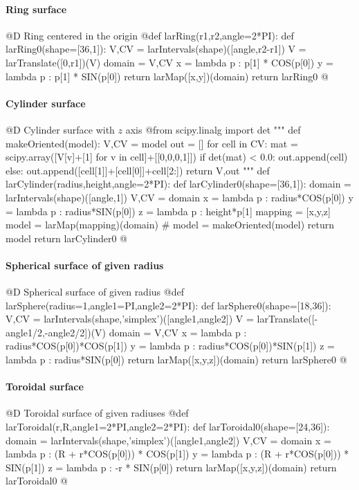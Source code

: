 \documentclass[11pt,oneside]{article}	%
\begin{document}
\paragraph{Ring surface}
@D Ring centered in the origin
@{def larRing(r1,r2,angle=2*PI):
	def larRing0(shape=[36,1]):
		V,CV = larIntervals(shape)([angle,r2-r1])
		V = larTranslate([0,r1])(V)
		domain = V,CV
		x = lambda p : p[1] * COS(p[0])
		y = lambda p : p[1] * SIN(p[0])
		return larMap([x,y])(domain)
	return larRing0
@}
\paragraph{Cylinder surface}
@D Cylinder surface with $z$ axis
@{from scipy.linalg import det
"""
def makeOriented(model):
	V,CV = model
	out = []
	for cell in CV: 
		mat = scipy.array([V[v]+[1] for v in cell]+[[0,0,0,1]])
		if det(mat) < 0.0:
			out.append(cell)
		else:
			out.append([cell[1]]+[cell[0]]+cell[2:])
	return V,out
"""
def larCylinder(radius,height,angle=2*PI):
	def larCylinder0(shape=[36,1]):
		domain = larIntervals(shape)([angle,1])
		V,CV = domain
		x = lambda p : radius*COS(p[0])
		y = lambda p : radius*SIN(p[0])
		z = lambda p : height*p[1]
		mapping = [x,y,z]
		model = larMap(mapping)(domain)
		# model = makeOriented(model)
		return model
	return larCylinder0
@}
\paragraph{Spherical surface of given radius}
@D Spherical surface of given radius
@{def larSphere(radius=1,angle1=PI,angle2=2*PI):
	def larSphere0(shape=[18,36]):
		V,CV = larIntervals(shape,'simplex')([angle1,angle2])
		V = larTranslate([-angle1/2,-angle2/2])(V)
		domain = V,CV
		x = lambda p : radius*COS(p[0])*COS(p[1])
		y = lambda p : radius*COS(p[0])*SIN(p[1])
		z = lambda p : radius*SIN(p[0])
		return larMap([x,y,z])(domain)
	return larSphere0
@}
\paragraph{Toroidal surface}
@D Toroidal surface of given radiuses
@{def larToroidal(r,R,angle1=2*PI,angle2=2*PI):
	def larToroidal0(shape=[24,36]):
		domain = larIntervals(shape,'simplex')([angle1,angle2])
		V,CV = domain
		x = lambda p : (R + r*COS(p[0])) * COS(p[1])
		y = lambda p : (R + r*COS(p[0])) * SIN(p[1])
		z = lambda p : -r * SIN(p[0])
		return larMap([x,y,z])(domain)
	return larToroidal0
@}
\end{document}
